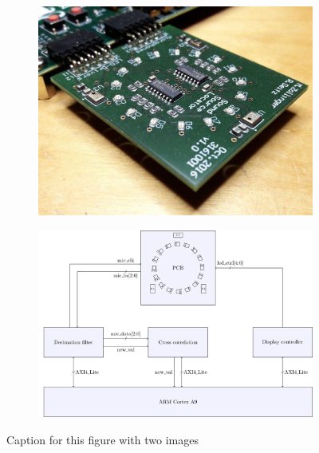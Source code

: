 
\usepackage{subcaption}


\maketitle
\setcounter{tocdepth}{2}

\begin{figure}[htbp]
	\begin{subfigure}{0.5\textwidth}
		\centering
		\includegraphics[scale=.4]{./block_diagram/pcb.jpg}
		\label{fig::top_block}
	\end{subfigure}
	\begin{subfigure}{0.5\textwidth}
		\centering
		\includegraphics[scale=.4]{./block_diagram/system_top.pdf}
		\label{fig::top_block}
	\end{subfigure}
	\caption{Caption for this figure with two images}
	\label{fig:image2}
\end{figure}

 






